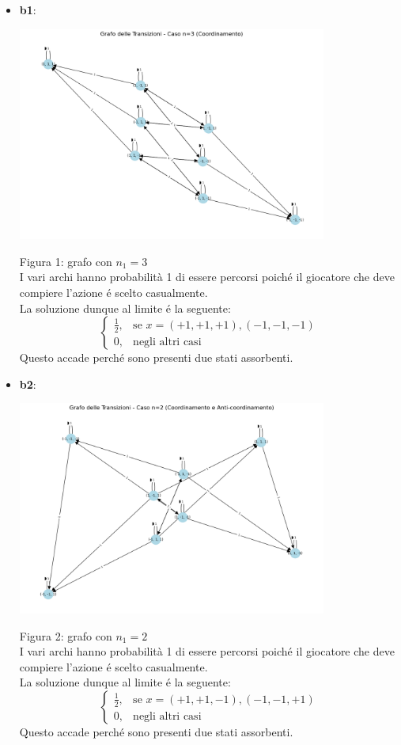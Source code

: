 \documentclass[a4paper,12pt]{article}
\begin{document}
	\newpage
	\begin{itemize}
		\item \textbf{b1}:
		\begin{center}
			\includegraphics[width=0.8\textwidth]{graf1.png}
		\end{center}
		
		Figura 1: grafo con $n_1=3$\\
		I vari archi hanno probabilità 1 di essere percorsi poiché il giocatore che deve compiere l'azione é scelto casualmente.\\
		La soluzione dunque al limite é la seguente:
		\[
		\begin{cases}
			\frac{1}{2}, & \text{se } x = (+1, +1, +1), (-1, -1, -1) \\[5pt]
			0, & \text{negli altri casi} 
		\end{cases}
		\]
		Questo accade perché sono presenti due stati assorbenti.
		\newpage
		\item \textbf{b2}:
		\begin{center}
			\includegraphics[width=0.8\textwidth]{graf2.png}
		\end{center}
		
		Figura 2: grafo con $n_1=2$\\
		I vari archi hanno probabilità 1 di essere percorsi poiché il giocatore che deve compiere l'azione é scelto casualmente.\\
		La soluzione dunque al limite é la seguente:
		\[
		\begin{cases}
			\frac{1}{2}, & \text{se } x = (+1, +1, -1), (-1, -1, +1) \\[5pt]
			0, & \text{negli altri casi} 
		\end{cases}
		\]
		Questo accade perché sono presenti due stati assorbenti.
	\end{itemize}
\end{document}
